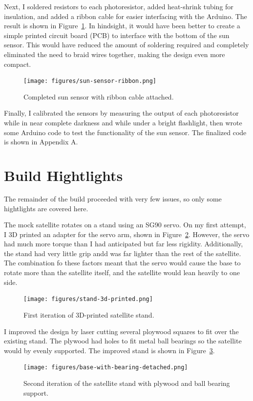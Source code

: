 Next, I soldered resistors to each photoresistor, added heat-shrink tubing for insulation, and added a ribbon cable for easier interfacing with the Arduino. The result is shown in Figure~\ref{fig:sun-sensor-ribbon}. In hindsight, it would have been better to create a simple printed circuit board (PCB) to interface with the bottom of the sun sensor. This would have reduced the amount of soldering required and completely eliminated the need to braid wires together, making the design even more compact. 
\begin{figure}[!ht]
    \centering
    \texttt{[image: figures/sun-sensor-ribbon.png]}
    \caption{Completed sun sensor with ribbon cable attached.}
    \label{fig:sun-sensor-ribbon}
\end{figure}

Finally, I calibrated the sensors by measuring the output of each photoresistor while in near complete darkness and while under a bright flashlight, then wrote some Arduino code to test the functionality of the sun sensor. The finalized code is shown in Appendix A.



\section*{Build Hightlights}

The remainder of the build proceeded with very few issues, so only some hightlights are covered here. 

The mock satellite rotates on a stand using an SG90 servo. On my first attempt, I 3D printed an adapter for the servo arm, shown in Figure~\ref{fig:stand-3d-printed}. However, the servo had much more torque than I had anticipated but far less rigidity. Additionally, the stand had very little grip andd was far lighter than the rest of the satellite. The combination fo these factors meant that the servo would cause the base to rotate more than the satellite itself, and the satellite would lean heavily to one side. 
\begin{figure}[!ht]
    \centering
    \texttt{[image: figures/stand-3d-printed.png]}
    \caption{First iteration of 3D-printed satellite stand. }
    \label{fig:stand-3d-printed}
\end{figure}

I improved the design by laser cutting several ploywood squares to fit over the existing stand. The plywood had holes to fit metal ball bearings so the satellite would by evenly supported. The improved stand is shown in Figure~\ref{fig:base-with-bearing-detached}.
\begin{figure}[!ht]
    \centering
    \texttt{[image: figures/base-with-bearing-detached.png]}
    \caption{Second iteration of the satellite stand with plywood and ball bearing support.}
    \label{fig:base-with-bearing-detached}
\end{figure}



